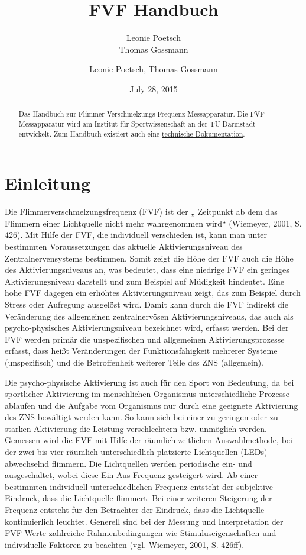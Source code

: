 \documentclass[11pt,accentcolor=tud2a,colorback,noheadingspace,bigchapter]{tudreport}
\date{July 28, 2015}
\author{Leonie Poetsch, Thomas Gossmann}
\title{FVF Handbuch}
\subtitle{Leonie Poetsch\\Thomas Gossmann}
\begin{document}
\maketitle

\begin{abstract}
Das Handbuch zur Flimmer-Verschmelzungs-Frequenz Messapparatur. Die 
FVF Messapparatur wird am Institut für Sportwissenschaft an der TU Darmstadt 
entwickelt. Zum Handbuch existiert auch eine  
\href{https://fvf.readthedocs.org}{technische Dokumentation}.
\end{abstract}

\tableofcontents

\chapter{Einleitung}
\label{introduction:einleitung}
\label{introduction::doc}
\label{introduction:fvf-handbuch}


Die Flimmerverschmelzungsfrequenz (FVF) ist der „ Zeitpunkt ab dem das Flimmern 
einer Lichtquelle nicht mehr wahrgenommen wird“ (Wiemeyer, 2001, S. 426). Mit Hilfe 
der FVF, die individuell verschieden ist, kann man unter bestimmten Voraussetzungen 
das aktuelle Aktivierungsniveau des Zentralnervensystems bestimmen.  Somit zeigt 
die Höhe der FVF auch die Höhe des Aktivierungsniveaus an, was bedeutet, dass eine 
niedrige FVF ein geringes Aktivierungsniveau darstellt und zum Beispiel auf 
Müdigkeit hindeutet. Eine hohe FVF dagegen ein erhöhtes Aktivierungsniveau zeigt, 
das zum Beispiel durch Stress oder Aufregung ausgelöst wird. Damit kann durch die 
FVF indirekt die Veränderung des allgemeinen zentralnervösen Aktivierungsniveaus, 
das auch als psycho-physisches Aktivierungsniveau bezeichnet wird, erfasst werden. 
Bei der FVF werden primär die unspezifischen und allgemeinen Aktivierungsprozesse 
erfasst, dass heißt Veränderungen der Funktionsfähigkeit mehrerer Systeme 
(unspezifisch) und die Betroffenheit weiterer Teile des ZNS (allgemein).

Die psycho-physische Aktivierung ist auch für den Sport von Bedeutung, da bei 
sportlicher Aktivierung im menschlichen Organismus unterschiedliche Prozesse 
ablaufen und die Aufgabe vom Organismus nur durch eine geeignete Aktivierung 
des ZNS bewältigt werden kann. So kann sich bei einer zu geringen oder zu 
starken Aktivierung die Leistung verschlechtern bzw. unmöglich werden. Gemessen 
wird die FVF mit Hilfe der räumlich-zeitlichen Auswahlmethode, bei der zwei bis 
vier räumlich unterschiedlich platzierte Lichtquellen (LEDs) abwechselnd flimmern. 
Die Lichtquellen werden periodische ein- und ausgeschaltet, wobei diese 
Ein-Aus-Frequenz gesteigert wird. Ab einer bestimmten individuell unterschiedlichen 
Frequenz entsteht der subjektive Eindruck, dass die Lichtquelle flimmert. Bei 
einer weiteren Steigerung der Frequenz entsteht für den Betrachter der Eindruck, 
dass die Lichtquelle kontinuierlich leuchtet. Generell sind bei der Messung und 
Interpretation der FVF-Werte zahlreiche Rahmenbedingungen wie Stimuluseigenschaften 
und individuelle Faktoren zu beachten (vgl. Wiemeyer, 2001, S. 426ff).
\end{document}
